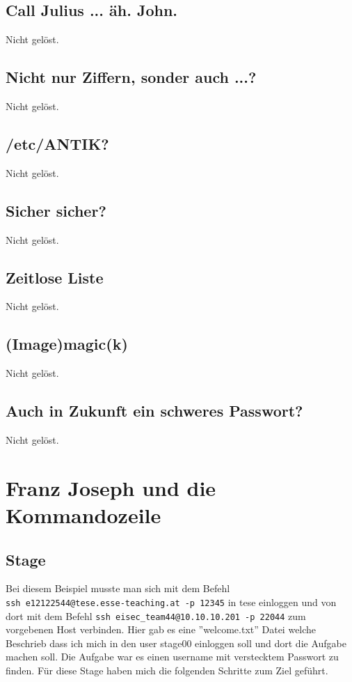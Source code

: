 \documentclass[12pt, a4paper, titlepage, oneside]{scrartcl}
\begin{document}
	\subsection{Call Julius ... äh. John.}
	Nicht gelöst.

	\subsection{Nicht nur Ziffern, sonder auch ...?}
	Nicht gelöst.

	\subsection{/etc/ANTIK?}
	Nicht gelöst.

	\subsection{Sicher sicher?}
	Nicht gelöst.

	\subsection{Zeitlose Liste}
	Nicht gelöst.

	\subsection{(Image)magic(k)}
	Nicht gelöst.

	\subsection{Auch in Zukunft ein schweres Passwort?}
	Nicht gelöst.

	\section{Franz Joseph und die Kommandozeile}

	\subsection{Stage}
	Bei diesem Beispiel musste man sich mit dem Befehl \\ \lstinline{ssh e12122544@tese.esse-teaching.at -p 12345}
	in tese einloggen und von dort mit dem Befehl \lstinline{ssh eisec_team44@10.10.10.201 -p 22044}
	zum vorgebenen Host verbinden. Hier gab es eine ''welcome.txt'' Datei welche
	Beschrieb dass ich mich in den user stage00 einloggen soll und dort die
	Aufgabe machen soll. Die Aufgabe war es einen username mit verstecktem Passwort
	zu finden. Für diese Stage haben mich die folgenden Schritte zum Ziel geführt.
\end{document}

